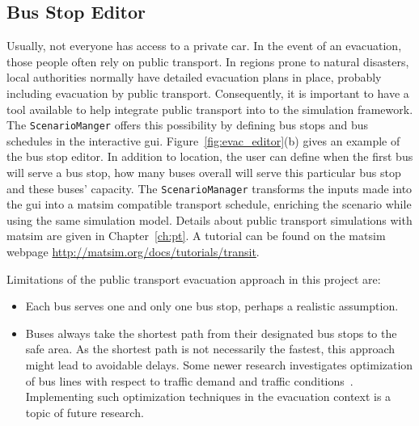 \subsection{Bus Stop Editor}
Usually, not everyone has access to a private car. In the event of an evacuation, those people often rely on public transport. In regions prone to natural disasters, local authorities normally have detailed evacuation plans in place, probably including evacuation by public transport. Consequently, it is important to have a tool available to help  integrate public transport into to the simulation framework. The \lstinline|ScenarioManger| offers this possibility by defining bus stops and bus schedules in the interactive \gls{gui}. Figure~\ref{fig:evac_editor}(b) gives an example of the bus stop editor. In addition to location, the user can define when the first bus will serve a bus stop, how many buses overall will serve this particular bus stop and these buses' capacity. 
The \lstinline|ScenarioManager| transforms the inputs made into the \gls{gui} into a \gls{matsim} compatible transport schedule, enriching the scenario while using the same simulation model. Details about public transport simulations with \gls{matsim} are given in Chapter~\ref{ch:pt}. A tutorial can be found on the \gls{matsim} webpage \url{http://matsim.org/docs/tutorials/transit}.

Limitations of the public transport evacuation approach in this project are:
\begin{itemize}\styleItemize
\item Each bus serves one and only one bus stop, perhaps a realistic assumption.
\item Buses always take the shortest path from their designated bus stops to the safe area. As the shortest path is not necessarily the fastest, this approach might lead to avoidable delays. Some newer research investigates optimization of bus lines with respect to traffic demand and traffic conditions~\citep{Neumann2014PhD}. Implementing such optimization techniques in the evacuation context is a topic of future research.
\end{itemize}

